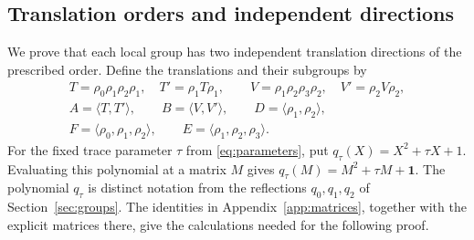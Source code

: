 \documentclass[11pt]{article}
\theoremstyle{definition}
\newcommand{\ang}[1]{\langle #1\rangle}
\begin{document}
\subsection{Translation orders and independent directions}
We prove that each local group has two independent translation directions
of the prescribed order. Define the translations and their subgroups by
\begin{equation}\label{eq:translations}
\begin{gathered}
 T=\rho_0\rho_1\rho_2\rho_1,\quad T'=\rho_1T\rho_1,
 \qquad V=\rho_1\rho_2\rho_3\rho_2,\quad V'=\rho_2V\rho_2,\\
 A=\ang{T,T'},\qquad B=\ang{V,V'},\qquad D=\ang{\rho_1,\rho_2},\\
 F=\ang{\rho_0,\rho_1,\rho_2},\qquad E=\ang{\rho_1,\rho_2,\rho_3}.
\end{gathered}
\end{equation}
For the fixed trace parameter $\tau$ from \eqref{eq:parameters}, put
$q_\tau(X)=X^2+\tau X+1$. Evaluating this polynomial at a matrix $M$ gives
$q_\tau(M)=M^2+\tau M+\mathbf 1$.
The polynomial $q_\tau$ is distinct notation from the reflections
$q_0,q_1,q_2$ of Section~\ref{sec:groups}.
The identities in Appendix~\ref{app:matrices}, together with the explicit
matrices there, give the calculations needed for the following proof.
\end{document}
